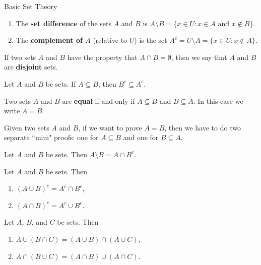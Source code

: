 \begin{section}{Basic Set Theory}
\begin{definition}
\begin{enumerate}
\item The \textbf{set difference} of the sets \(A\) and \(B\) is \(A \setminus B =\{x\in U : x\in A \mbox{ and } x\notin B \}\).

\item The \textbf{complement of \(A\)} (relative to \(U\)) is the set \(A^c=U \setminus A =\{x \in U : x \notin A\}\).
\end{enumerate}
\end{definition}

\begin{definition}
If two sets \(A\) and \(B\) have the property that \(A \cap B = \emptyset\), then we say that \(A\) and \(B\) are \textbf{disjoint} sets.
\end{definition}

\begin{theorem}
Let \(A\) and \(B\) be sets.  If \(A \subseteq B\), then \(B^c \subseteq A^c\).
\end{theorem}

\begin{definition}
Two sets \(A\) and \(B\) are \textbf{equal} if and only if \(A \subseteq B\) and \(B \subseteq A\).  In this case we write \(A = B\).
\end{definition}

\begin{remark}
Given two sets \(A\) and \(B\), if we want to prove \(A=B\), then we have to do two separate ``mini" proofs: one for \(A\subseteq B\) and one for \(B\subseteq A\).
\end{remark}

\begin{theorem}
Let \(A\) and \(B\) be sets.  Then \(A\setminus B = A \cap B^c\).
\end{theorem}

\begin{theorem}
Let \(A\) and \(B\) be sets. Then 
\begin{enumerate}
\item \((A \cup B)^c = A^c \cap B^c\),
\item \((A \cap B)^c = A^c \cup B^c\).
\end{enumerate}
\end{theorem}

\begin{theorem}
Let \(A\), \(B\), and \(C\) be sets. Then
\begin{enumerate}
\item \(A \cup(B\cap C) = (A\cup B)\cap (A\cup C)\),
\item \(A\cap (B\cup C)= (A\cap B)\cup (A\cap C)\).
\end{enumerate}
\end{theorem}


\end{section}
